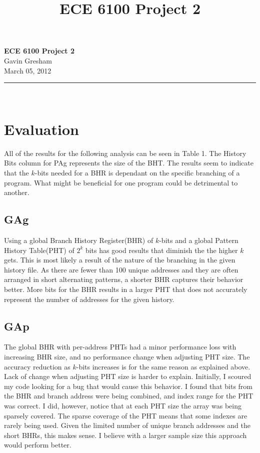\documentclass[letterpaper,11pt]{article}
\title{ECE 6100 Project 2}
\begin{document}
\begin{center}
\textbf{ECE 6100 Project 2}\\
Gavin Gresham\\
March 05, 2012\\
\rule{3in}{1pt}\\
\end{center}

\section{Evaluation}
All of the results for the following analysis can be seen in Table 1. The History Bits column for PAg represents the size of the BHT. The results seem to indicate that the $k$-bits needed for a BHR is dependant on the specific branching of a program. What might be beneficial for one program could be detrimental to another.
\subsection{GAg}
Using a global Branch History Register(BHR) of $k$-bits and a global Pattern History Table(PHT) of $2^k$ bits has good results that diminish the the higher $k$ gets. This is most likely a result of the nature of the branching in the given history file. As there are fewer than 100 unique addresses and they are often arranged in short alternating patterns, a shorter BHR captures their behavior better. More bits for the BHR results in a larger PHT that does not accurately represent the number of addresses for the given history.
\subsection{GAp}
The global BHR with per-address PHTs had a minor performance loss with increasing BHR size, and no performance change when adjusting PHT size. The accuracy reduction as $k$-bits increases is for the same reason as explained above. Lack of change when adjusting PHT size is harder to explain.
Initially, I scoured my code looking for a bug that would cause this behavior. I found that bits from the BHR and branch address were being combined, and index range for the PHT was correct. I did, however, notice that at each PHT size the array was being sparsely covered.
The sparse coverage of the PHT means that some indexes are rarely being used. Given the limited number of unique branch addresses and the short BHRs, this makes sense. I believe with a larger sample size this approach would perform better.
\end{document}
